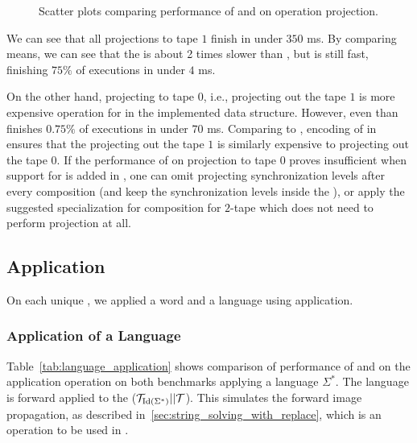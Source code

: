 \begin{figure}[ht]
    \centering
    \quad
    \caption{
      Scatter plots comparing performance of \mata and \mona on operation projection.
    }
    \label{fig:projection}%
\end{figure}

We can see that all projections to tape $1$ finish in under $350$ ms.
By comparing means, we can see that the \mata is about 2 times slower than \mona, but is still fast, finishing $75\%$ of executions in under $4$ ms.

On the other hand, projecting to tape $0$, i.e., projecting out the tape $1$ is more expensive operation for \mata in the implemented data structure.
However, even than \mata finishes $0.75\%$ of executions in under $70$ ms.
Comparing to \mona, encoding of \nfts in \mona ensures that the projecting out the tape $1$ is similarly expensive to projecting out the tape $0$.
If the performance of \mata on projection to tape $0$ proves insufficient when support for \nfts is added in \noodler, one can omit projecting synchronization levels after every composition (and keep the synchronization levels inside the \nft), or apply the suggested specialization for composition for $2$-tape \nfts which does not need to perform projection at all.

\subsection{Application}

On each unique \nft, we applied a word and a language using \nft application.

\subsubsection{Application of a Language}

Table~\ref{tab:language_application} shows comparison of performance of \mata and \mona on the application operation on both benchmarks applying a language $\Sigma^*$.
The language is forward applied to the \nft ($\mathcal{T}_{\text{Id}(\Sigma^*)} || \mathcal{T} $).
This simulates the forward image propagation, as described in~\ref{sec:string_solving_with_replace}, which is an operation to be used in \noodler.


